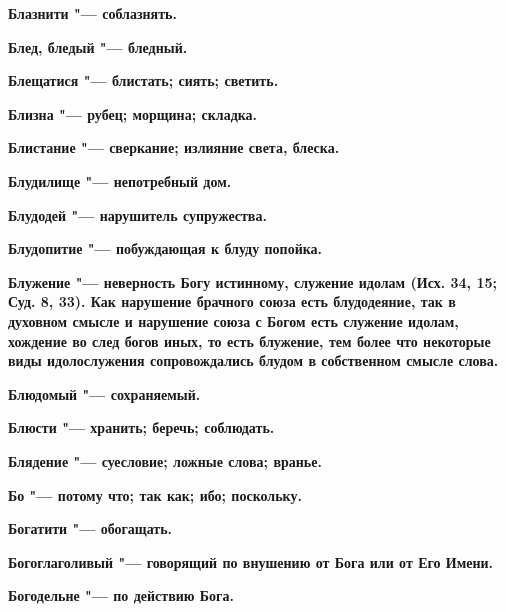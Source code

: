 \bfseries Блазнити \normalfont{} "--- соблазнять. 




\bfseries Блед, бледый \normalfont{} "--- бледный. 




\bfseries Блещатися \normalfont{} "--- блистать; сиять; светить. 




\bfseries Близна \normalfont{} "--- рубец; морщина; складка. 




\bfseries Блистание \normalfont{} "--- сверкание; излияние света, блеска. 




\bfseries Блудилище \normalfont{} "--- непотребный дом. 




\bfseries Блудодей \normalfont{} "--- нарушитель супружества. 




\bfseries Блудопитие \normalfont{} "--- побуждающая к блуду попойка. 




\bfseries Блужение \normalfont{} "--- неверность Богу истинному, служение идолам (Исх. 34, 15; Суд. 8, 33). Как нарушение брачного союза есть блудодеяние, так в духовном смысле и нарушение союза с Богом есть служение идолам, хождение во след богов иных, то есть блужение, тем более что некоторые виды идолослужения сопровождались блудом в собственном смысле слова. 




\bfseries Блюдомый \normalfont{} "--- сохраняемый. 




\bfseries Блюсти \normalfont{} "--- хранить; беречь; соблюдать. 




\bfseries Блядение \normalfont{} "--- суесловие; ложные слова; вранье. 




\bfseries Бо \normalfont{} "--- потому что; так как; ибо; поскольку. 




\bfseries Богатити \normalfont{} "--- обогащать. 




\bfseries Богоглаголивый \normalfont{} "--- говорящий по внушению от Бога или от Его Имени. 




\bfseries Богодельне \normalfont{} "--- по действию Бога. 




